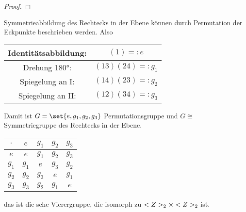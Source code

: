 \begin{proof}
	\sest
\end{proof}
\begin{example}
	Symmetrieabbildung des Rechtecks in der Ebene
%		
%			
%			
%			
%			
%		
können durch Permutation der Eckpunkte beschrieben werden. Also
\begin{center}
	\begin{tabular}{c|c}
		Identitätsabbildung: & $(1) =: e$\\
		\hline
		Drehung 180°: & $(13)(24) =: g_1$\\
		Spiegelung an I: & $(14)(23) =: g_2$\\
		Spiegelung an II: & $(12)(34) =: g_3$  
	\end{tabular}
\end{center}
Damit ist $G = \set{e,g_1,g_2,g_3}$ Permutationsgruppe und $G \cong$ Symmetriegruppe des Rechtecks in der Ebene.
\begin{center}
	\begin{tabular}{c|cccc}
		$\cdot$ & $e$ 	& $g_1$ & $g_2$ & $g_3$\\
		\hline
		$e$   	& $e$   & $g_1$ & $g_2$ & $g_3$\\
		$g_1$ 	& $g_1$ & $e$   & $g_3$ & $g_2$\\
		$g_2$ 	& $g_2$ & $g_3$ & $e$   & $g_1$\\
		$g_3$ 	& $g_3$ & $g_2$ & $g_1$ & $e$\\
	\end{tabular}
\end{center}
das ist die sche Vierergruppe, die isomorph zu $<Z>_2 \times <Z>_2$ ist.
\end{example}
